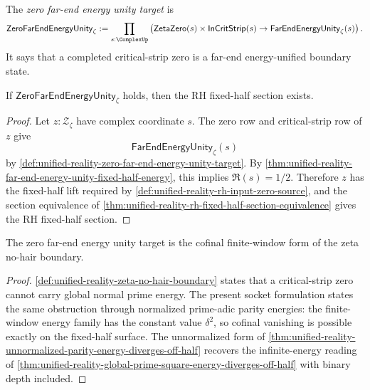 \begin{definition}
\label{def:unified-reality-zero-far-end-energy-unity-target}
The \emph{zero far-end energy unity target} is
$$
\mathsf{ZeroFarEndEnergyUnity}_{\zeta}
:=
\prod_{s:\ComplexUp}
\left(
\mathsf{ZetaZero}(s)
\times
\mathsf{InCritStrip}(s)
\to
\mathsf{FarEndEnergyUnity}_{\zeta}(s)
\right).
$$
It says that a completed critical-strip zero is a far-end
energy-unified boundary state.
\end{definition}

\begin{theorem}
\label{thm:unified-reality-zero-far-end-energy-unity-conditionally-sufficient}
If $\mathsf{ZeroFarEndEnergyUnity}_{\zeta}$ holds, then the RH fixed-half
section exists.
\end{theorem}

\begin{proof}
Let $z:\mathcal Z_{\zeta}$ have complex coordinate $s$.  The zero row and
critical-strip row of $z$ give
$$
\mathsf{FarEndEnergyUnity}_{\zeta}(s)
$$
by
\autoref{def:unified-reality-zero-far-end-energy-unity-target}.  By
\autoref{thm:unified-reality-far-end-energy-unity-fixed-half-energy},
this implies $\Re(s)=1/2$.  Therefore $z$ has the fixed-half lift
required by
\autoref{def:unified-reality-rh-input-zero-source}, and the section
equivalence of
\autoref{thm:unified-reality-rh-fixed-half-section-equivalence} gives the
RH fixed-half section.
\end{proof}

\begin{corollary}
\label{cor:unified-reality-energy-unity-socket-no-hair}
The zero far-end energy unity target is the cofinal finite-window form of
the zeta no-hair boundary.
\end{corollary}

\begin{proof}
\autoref{def:unified-reality-zeta-no-hair-boundary} states that a
critical-strip zero cannot carry global normal prime energy.  The present
socket formulation states the same obstruction through normalized
prime-adic parity energies: the finite-window energy family has the
constant value $\delta^2$, so cofinal vanishing is possible exactly on
the fixed-half surface.  The unnormalized form of
\autoref{thm:unified-reality-unnormalized-parity-energy-diverges-off-half}
recovers the infinite-energy reading of
\autoref{thm:unified-reality-global-prime-square-energy-diverges-off-half}
with binary depth included.
\end{proof}

